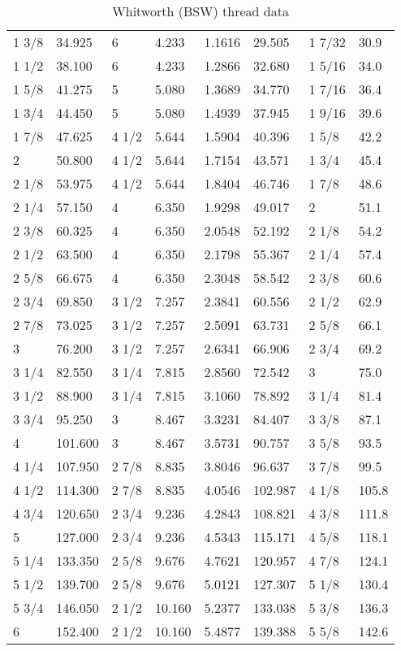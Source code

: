 \begin{table}[h!]
\begin{longtable}{ll|ll|ll|ll}
1 3/8 &34.925 &6 &4.233 &1.1616 &29.505 &1 7/32 &30.9\\
1 1/2 &38.100 &6 &4.233 &1.2866 &32.680 &1 5/16 &34.0\\
1 5/8 &41.275 &5 &5.080 &1.3689 &34.770 &1 7/16 &36.4\\
1 3/4 &44.450 &5 &5.080 &1.4939 &37.945 &1 9/16 &39.6\\
1 7/8 &47.625 & 4 1/2 &5.644 &1.5904 &40.396 &1 5/8 &42.2\\
2 &50.800 & 4 1/2 &5.644 &1.7154 &43.571 &1 3/4 &45.4\\
2 1/8 &53.975 & 4 1/2 &5.644 &1.8404 &46.746 &1 7/8 &48.6\\
2 1/4 &57.150 &4 &6.350 &1.9298 &49.017 &2 &51.1\\
2 3/8 &60.325 &4 &6.350 &2.0548 &52.192 &2 1/8 &54.2\\
2 1/2 &63.500 &4 &6.350 &2.1798 &55.367 &2 1/4 &57.4\\
2 5/8 &66.675 &4 &6.350 &2.3048 &58.542 &2 3/8 &60.6\\
2 3/4 &69.850 & 3 1/2 &7.257 &2.3841 &60.556 &2 1/2 &62.9\\
2 7/8 &73.025 & 3 1/2 &7.257 &2.5091 &63.731 &2 5/8 &66.1\\
3 &76.200 & 3 1/2 &7.257 &2.6341 &66.906 &2 3/4 &69.2\\
3 1/4 &82.550 & 3 1/4 &7.815 &2.8560 &72.542 &3 &75.0\\
3 1/2 &88.900 & 3 1/4 &7.815 &3.1060 &78.892 &3 1/4 &81.4\\
3 3/4 &95.250 &3 &8.467 &3.3231 &84.407 &3 3/8 &87.1\\
4 &101.600 &3 &8.467 &3.5731 &90.757 &3 5/8 &93.5\\
4 1/4 &107.950 & 2 7/8 &8.835 &3.8046 &96.637 &3 7/8 &99.5\\
4 1/2 &114.300 & 2 7/8 &8.835 &4.0546 &102.987 &4 1/8 &105.8\\
4 3/4 &120.650 & 2 3/4 &9.236 &4.2843 &108.821 &4 3/8 &111.8\\
5 &127.000 & 2 3/4 &9.236 &4.5343 &115.171 &4 5/8 &118.1\\
5 1/4 &133.350 & 2 5/8 &9.676 &4.7621 &120.957 &4 7/8 &124.1\\
5 1/2 &139.700 & 2 5/8 &9.676 &5.0121 &127.307 &5 1/8 &130.4\\
5 3/4 &146.050 & 2 1/2 &10.160 &5.2377 &133.038 &5 3/8 &136.3\\
6 &152.400 & 2 1/2 &10.160 &5.4877 &139.388 &5 5/8 &142.6\\
\end{longtable}
	\caption{Whitworth (BSW) thread data}
\end{table}
\clearpage

